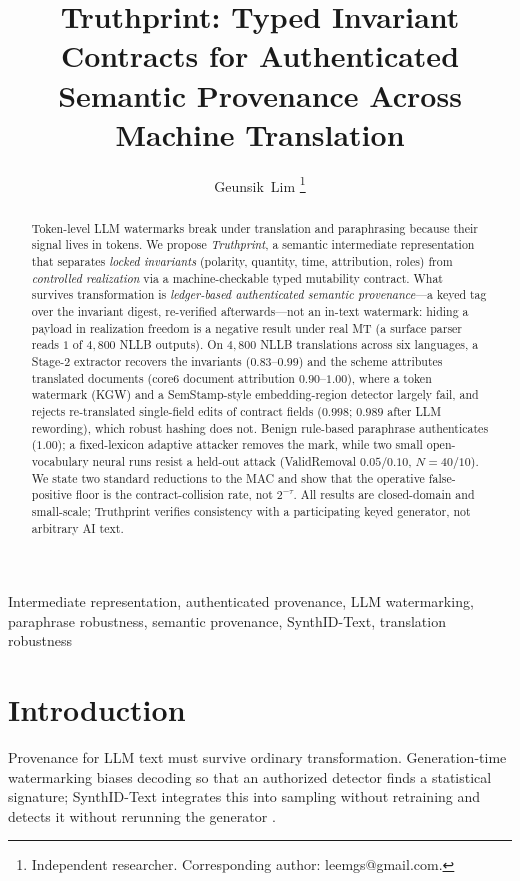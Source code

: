 \documentclass[journal]{IEEEtran}
\title{Truthprint: Typed Invariant Contracts for Authenticated Semantic Provenance Across Machine Translation}
\author{Geunsik~Lim%
\thanks{Independent researcher. Corresponding author: leemgs@gmail.com.}%
}
\begin{document}
\maketitle

\begin{abstract}
Token-level LLM watermarks break under translation and paraphrasing because their signal lives in tokens. We propose \emph{Truthprint}, a semantic intermediate representation that separates \emph{locked invariants} (polarity, quantity, time, attribution, roles) from \emph{controlled realization} via a machine-checkable typed mutability contract. What survives transformation is \emph{ledger-based authenticated semantic provenance}---a keyed tag over the invariant digest, re-verified afterwards---not an in-text watermark: hiding a payload in realization freedom is a negative result under real MT (a surface parser reads $1$ of $4{,}800$ NLLB outputs). On $4{,}800$ NLLB translations across six languages, a Stage-2 extractor recovers the invariants ($0.83$--$0.99$) and the scheme attributes translated documents (core6 document attribution $0.90$--$1.00$), where a token watermark (KGW) and a SemStamp-style embedding-region detector largely fail, and rejects re-translated single-field edits of contract fields ($0.998$; $0.989$ after LLM rewording), which robust hashing does not. Benign rule-based paraphrase authenticates ($1.00$); a fixed-lexicon adaptive attacker removes the mark, while two small open-vocabulary neural runs resist a held-out attack (ValidRemoval $0.05$/$0.10$, $N{=}40$/$10$). We state two standard reductions to the MAC and show that the operative false-positive floor is the contract-collision rate, not $2^{-\tau}$. All results are closed-domain and small-scale; Truthprint verifies consistency with a participating keyed generator, not arbitrary AI text.
\end{abstract}

\begin{IEEEkeywords}
Intermediate representation, authenticated provenance, LLM watermarking, paraphrase robustness, semantic provenance, SynthID-Text, translation robustness
\end{IEEEkeywords}

\section{Introduction}
Provenance for LLM text must survive ordinary transformation. Generation-time watermarking biases decoding so that an authorized detector finds a statistical signature; SynthID-Text integrates this into sampling without retraining and detects it without rerunning the generator \cite{dathathri2024synthid}.
\end{document}
